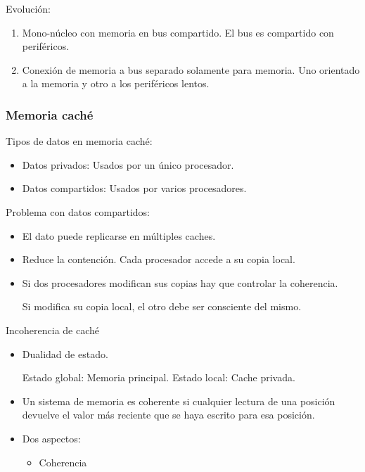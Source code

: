 \documentclass[12pt, twoside, openright]{report} %
\begin{document}
\begin{itemize}
	      Evolución:

	      \begin{enumerate}


		      \item Mono-núcleo con memoria en bus compartido. El bus es
		            compartido con periféricos.
		      \item Conexión de memoria a bus separado solamente para memoria. Uno
		            orientado a la memoria y otro a los periféricos lentos.
	      \end{enumerate}


	      \subsubsection{Memoria caché}



	      Tipos de datos en memoria caché:

	      \begin{itemize}

		      \item Datos privados: Usados por un único procesador.
		      \item Datos compartidos: Usados por varios procesadores.
	      \end{itemize}

	      Problema con datos compartidos:

	      \begin{itemize}

		      \item El dato puede replicarse en múltiples caches.
		      \item Reduce la contención. Cada procesador accede a su copia local.
		      \item Si dos procesadores modifican sus copias hay que controlar la
		            coherencia.


		            Si modifica su copia local, el otro debe ser consciente del
		            mismo.
	      \end{itemize}

	      Incoherencia de caché

	      \begin{itemize}

		      \item Dualidad de estado.


		            Estado global: Memoria principal.
		            Estado local: Cache privada.
		      \item Un sistema de memoria es coherente si cualquier lectura de una
		            posición devuelve el valor más reciente que se haya escrito
		            para esa posición.
		      \item Dos aspectos:
		            \begin{itemize}
			            \item Coherencia


\end{itemize}
\end{itemize}
\end{itemize}
\end{document}
